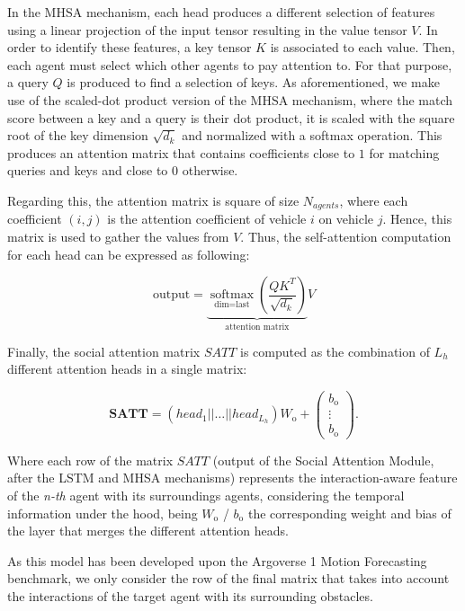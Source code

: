 In the \ac{MHSA} mechanism, each head produces a different selection of features using a linear projection of the input tensor resulting in the value tensor $V$. In order to identify these features, a key tensor $K$ is associated to each value. Then, each agent must select which other agents to pay attention to. For that purpose, a query $Q$ is produced to find a selection of keys. As aforementioned, we make use of the scaled-dot product version of the \ac{MHSA} mechanism, where the match score between a key and a query is their dot product, it is scaled with the square root of the key dimension $\sqrt{d_k}$ and normalized with a softmax operation. This produces an attention matrix that contains coefficients close to $1$ for matching queries and keys and close to $0$ otherwise.

Regarding this, the attention matrix is square of size $N_{agents}$, where each coefficient $(i, j)$ is the attention coefficient of vehicle $i$ on vehicle $j$. Hence, this matrix is used to gather the values from $V$. Thus, the self-attention computation for each head can be expressed as following:

\begin{equation}
	\text{output}=\underbrace{\underset{\text{dim}=\text{last}}{\operatorname{softmax}}\left(\frac{QK^T}{\sqrt{d_k}}\right)}_{\text{attention matrix}}V
	\label{eq:5_self_attention_single_head}
\end{equation}

Finally, the social attention matrix $SATT$ is computed as the combination of $L_h$ different attention heads in a single matrix:

\begin{equation}
	\mathbf{SATT} = (head_1 || \dots || head_{L_h}) W_\mathrm{o} + 
	\begin{pmatrix}
		b_\mathrm{o}\\
		\vdots \\
		b_\mathrm{o}
	\end{pmatrix}.
\end{equation}

Where each row of the matrix $SATT$ (output of the Social Attention Module, after the \ac{LSTM} and \ac{MHSA} mechanisms) represents the interaction-aware feature of the \textit{n-th} agent with its surroundings agents, considering the temporal information under the hood, being $W_\mathrm{o}$ / $b_\mathrm{o}$ the corresponding weight and bias of the layer that merges the different attention heads.

As this model has been developed upon the Argoverse 1 Motion Forecasting benchmark, we only consider the row of the final matrix that takes into account the interactions of the target agent with its surrounding obstacles.

